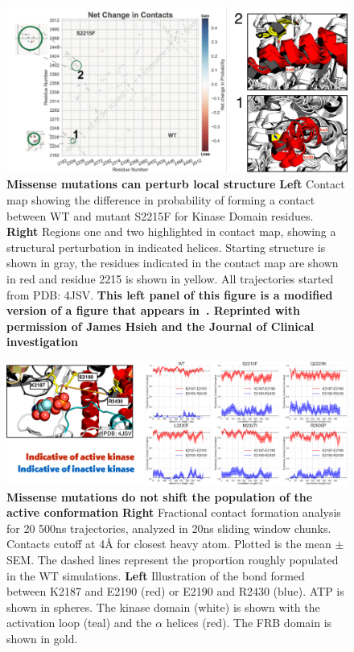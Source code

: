 \documentclass[phd,tocprelim]{cornell}
\begin{document}
\begin{landscape}
	\begin{figure}[p]
		\centering
		\includegraphics[width=1.0\linewidth]{figures/mtor-fig4.pdf}
		\caption[Missense mutations can perturb local structure]{
		{\bf Missense mutations can perturb local structure}
		 {\bf Left} Contact map showing the difference in probability of forming a contact between WT and mutant S2215F for Kinase Domain residues. {\bf Right} Regions one and two highlighted in contact map, showing a structural perturbation in indicated helices. Starting structure is shown in gray, the residues indicated in the contact map are shown in red and residue 2215 is shown in yellow. All trajectories started from PDB: 4JSV. \bf{This left panel of this figure is a modified version of a figure that appears in~\citep{Xu:2016fw}. Reprinted with permission of James Hsieh and the Journal of Clinical investigation}
	}
	\label{fig:mtor-figure4}
\end{figure}
\end{landscape}

\begin{landscape}
	\begin{figure}[p]
		\centering
		\includegraphics[width=1.0\linewidth]{figures/mtor-fig5.pdf}
		\caption[Missense mutations do not shift the population of the active conformation]{
			{\bf Missense mutations do not shift the population of the active conformation}
			{\bf Right} Fractional contact formation analysis for 20 500ns trajectories, analyzed in 20ns sliding window chunks. Contacts cutoff at 4Å for closest heavy atom.  Plotted is the mean $\pm$ SEM. The dashed lines represent the proportion roughly populated in the WT simulations. {\bf Left} Illustration of the bond formed between K2187 and E2190 (red) or E2190 and R2430 (blue). ATP is shown in spheres. The kinase domain (white) is shown with the activation loop (teal) and the $\alpha$ helices (red). The FRB domain is shown in gold. 
			}
		\label{fig:mtor-figure5}
	\end{figure}
\end{landscape}
\end{document}
